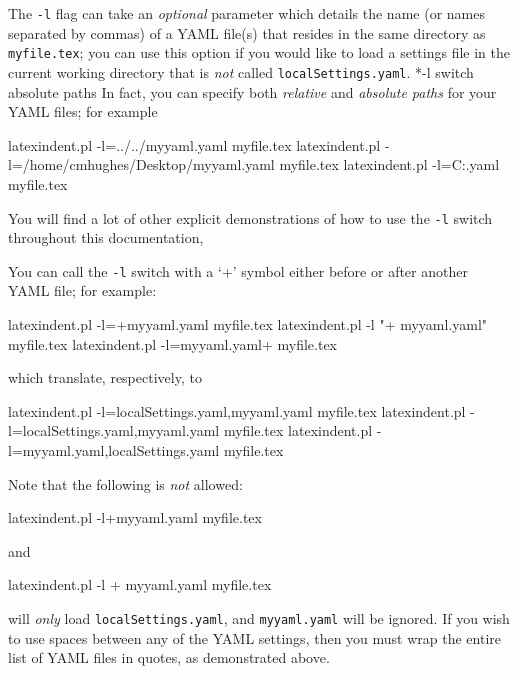 	The \texttt{-l} flag can take an \emph{optional} parameter which details the name (or
	names separated by commas) of a YAML file(s) that resides in the same directory as
	\texttt{myfile.tex}; you can use this option if you would like to load a settings file in
	the current working directory that is \emph{not} called \texttt{localSettings.yaml}.
	*{-l switch absolute paths} In fact, you can specify both
	\emph{relative} and \emph{absolute paths} for your YAML files; for example%
	\begin{commandshell}
latexindent.pl -l=../../myyaml.yaml myfile.tex
latexindent.pl -l=/home/cmhughes/Desktop/myyaml.yaml myfile.tex
latexindent.pl -l=C:\Users\cmhughes\Desktop\myyaml.yaml myfile.tex
\end{commandshell}
	You will find a lot of other explicit demonstrations of how to use the \texttt{-l} switch
	throughout this documentation,

	You can call the \texttt{-l} switch with a `+' symbol either before or after
	 another YAML file; for example:
	\begin{commandshell}
latexindent.pl -l=+myyaml.yaml myfile.tex
latexindent.pl -l "+ myyaml.yaml" myfile.tex
latexindent.pl -l=myyaml.yaml+  myfile.tex
\end{commandshell}
	which translate, respectively, to
	\begin{commandshell}
latexindent.pl -l=localSettings.yaml,myyaml.yaml myfile.tex
latexindent.pl -l=localSettings.yaml,myyaml.yaml myfile.tex
latexindent.pl -l=myyaml.yaml,localSettings.yaml myfile.tex
\end{commandshell}
	Note that the following is \emph{not} allowed:
	\begin{commandshell}
latexindent.pl -l+myyaml.yaml myfile.tex
\end{commandshell}
	and
	\begin{commandshell}
latexindent.pl -l + myyaml.yaml myfile.tex
\end{commandshell}
	will \emph{only} load \texttt{localSettings.yaml}, and \texttt{myyaml.yaml} will be
	ignored. If you wish to use spaces between any of the YAML settings, then you must wrap
	the entire list of YAML files in quotes, as demonstrated above.

